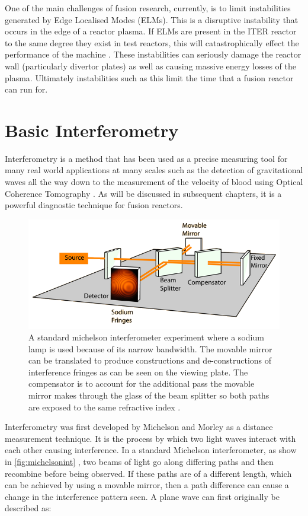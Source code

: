 \documentclass[12pt,a4paper,oneside]{report}
\begin{document}
One of the main challenges of fusion research, currently, is to limit instabilities generated by Edge Localised Modes (ELMs). This is a disruptive instability that occurs in the edge of a reactor plasma. If ELMs are present in the ITER reactor to the same degree they exist in test reactors, this will catastrophically effect the performance of the machine \cite{Loarte2014ProgressOperation}. These instabilities can seriously damage the reactor wall (particularly divertor plates) as well as causing massive energy losses of the plasma. Ultimately instabilities such as this limit the time that a fusion reactor can run for.
	
	\section{Basic Interferometry}
Interferometry is a method that has been used as a precise measuring tool for many real world applications at many scales such as the detection of gravitational waves \cite{AbbottObservationMerger} all the way down to the measurement of the velocity of blood using Optical Coherence Tomography \cite{Zhao2000Phase-resolvedSensitivity}. As will be discussed in subsequent chapters, it is a powerful diagnostic technique for fusion reactors.
\begin{figure}[H]
\includegraphics[width=1\textwidth, center,angle=0]{Images/michelsonint.png}
\caption{A standard michelson interferometer experiment where a sodium lamp is used because of its narrow bandwidth. The movable mirror can be translated to produce constructions and de-constructions of interference fringes as can be seen on the viewing plate. The compensator is to account for the additional pass the movable mirror makes through the glass of the beam splitter so both paths are exposed to the same refractive index \cite{Michelsonimage}.}
\label{fig:michelsonint}
\end{figure}

Interferometry was first developed by Michelson and Morley \cite{Michelson1887RelativeEther} as a distance measurement technique. It is the process by which two light waves interact with each other causing interference. In a standard Michelson interferometer, as show in \autoref{fig:michelsonint} , two beams of light go along differing paths and then recombine before being observed. If these paths are of a different length, which can be achieved by using a movable mirror, then a path difference can cause a change in the interference pattern seen. A plane wave can first originally be described as: 
\end{document}
